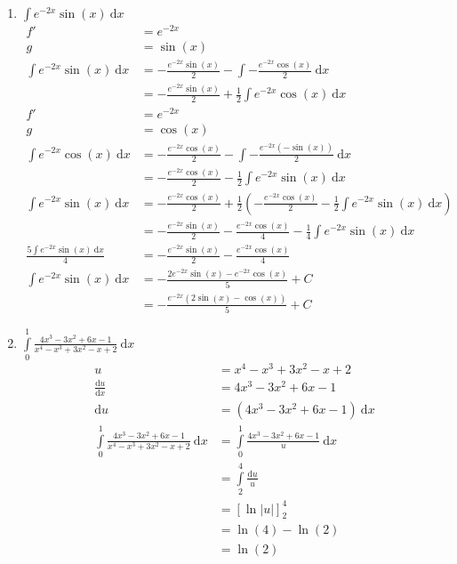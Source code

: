 \documentclass[10pt]{article}
\begin{document}
\begin{enumerate}[start=5,leftmargin=1in]
\begin{enumerate}
        \item $\int e^{-2x} \sin(x) \: \text{d}x$
        \begin{align*}
            f' &= e^{-2x} \\
            g &= \sin(x) \\
            \int e^{-2x} \sin(x) \: \text{d}x &= -\frac{e^{-2x} \sin(x)}{2} - \int -\frac{e^{-2x} \cos(x)}{2} \: \text{d}x \\
            &= -\frac{e^{-2x} \sin(x)}{2} + \frac{1}{2} \int e^{-2x} \cos(x) \: \text{d}x \\
            f' &= e^{-2x} \\
            g &= \cos(x) \\
            \int e^{-2x} \cos(x) \: \text{d}x &= -\frac{e^{-2x} \cos(x)}{2} - \int -\frac{e^{-2x} (-\sin(x))}{2} \: \text{d}x \\
            &= -\frac{e^{-2x} \cos(x)}{2} - \frac{1}{2} \int e^{-2x} \sin(x) \: \text{d}x \\
            \int e^{-2x} \sin(x) \: \text{d}x &= -\frac{e^{-2x} \cos(x)}{2}  + \frac{1}{2} \left(- \frac{e^{-2x} \cos(x)}{2} - \frac{1}{2} \int e^{-2x} \sin(x) \: \text{d}x\right) \\
            &= -\frac{e^{-2x} \sin(x)}{2} - \frac{e^{-2x} \cos(x)}{4} - \frac{1}{4} \int e^{-2x} \sin(x) \: \text{d}x \\
            \frac{5\int e^{-2x} \sin(x) \: \text{d}x}{4} &= -\frac{e^{-2x} \sin(x)}{2} - \frac{e^{-2x} \cos(x)}{4} \\
            \int e^{-2x} \sin(x) \: \text{d}x &= -\frac{2e^{-2x} \sin(x) - e^{-2x} \cos(x)}{5} + C \\
            &= -\frac{e^{-2x}(2\sin(x) - \cos(x))}{5} + C
        \end{align*}

        \item $\int\limits_0^1 \frac{4x^{3} - 3x^{2} + 6x - 1}{x^{4} - x^{3} + 3x^{2} - x + 2} \: \text{d}x$
        \begin{align*}
            u &= x^{4} - x^{3} + 3x^{2} - x + 2 \\
            \frac{\text{d}u}{\text{d}x} &= 4x^{3} - 3x^{2} + 6x - 1 \\
            \text{d}u &= (4x^{3} - 3x^{2} + 6x - 1) \: \text{d}x \\
            \int\limits_0^1 \frac{4x^{3} - 3x^{2} + 6x - 1}{x^{4} - x^{3} + 3x^{2} - x + 2} \: \text{d}x &= \int\limits_0^1 \frac{4x^{3} - 3x^{2} + 6x - 1}{u} \: \text{d}x \\
            &= \int\limits_2^4 \frac{\text{d}u}{u} \\
            &= [\ln|u|]_2^4 \\
            &= \ln(4) - \ln(2) \\
            &= \ln(2)
        \end{align*}


\end{enumerate}
\end{enumerate}
\end{document}
